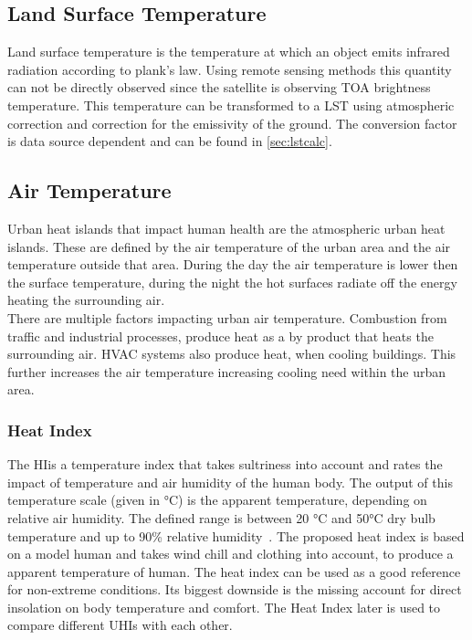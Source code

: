 \documentclass[12pt,a4paper, english]{article}
\begin{document}
\subsection{Land Surface Temperature}
Land surface temperature is the temperature at which an object emits infrared radiation according to plank's law\cite{Liang2020}.
Using remote sensing methods this quantity can not be directly observed since the satellite is observing \gls{TOA} brightness temperature.
This temperature can be transformed to a \gls{LST} using atmospheric correction and correction for the emissivity of the ground.
The conversion factor is data source dependent and can be found in \cref{sec:lstcalc}.

%
\subsection{Air Temperature}
Urban heat islands that impact human health are the atmospheric urban heat islands. 
These are defined by the air temperature of the urban area and the air temperature outside that area. %
%
During the day the air temperature is lower then the surface temperature\cite{EPA2008}, during the night the hot surfaces radiate off the energy heating the surrounding air.\\
%
There are multiple factors impacting urban air temperature. 
Combustion from traffic and industrial processes, produce heat as a by product that heats the surrounding air. 
HVAC systems also produce heat, when cooling buildings. This further increases the air temperature increasing cooling need within the urban area. 
    
    \newpage
    \subsubsection{Heat Index}
    The \gls{HI}is a temperature index that takes sultriness into account and rates the impact of temperature and air humidity of the human body. 
    The output of this temperature scale (given in °C) is the apparent temperature, depending on relative air humidity. 
    The defined range is between 20 °C and 50°C dry bulb temperature and up to 90\% relative humidity~\cite[p. 862]{Steadman1979}. 
    The proposed heat index is based on a model human and takes wind chill and clothing into account, to produce a apparent temperature of human. 
    The heat index can be used as a good reference for non-extreme conditions. 
    Its biggest downside is the missing account for direct insolation on body temperature and comfort.
    The Heat Index later is used to compare different \glspl{UHI} with each other.
\end{document}

